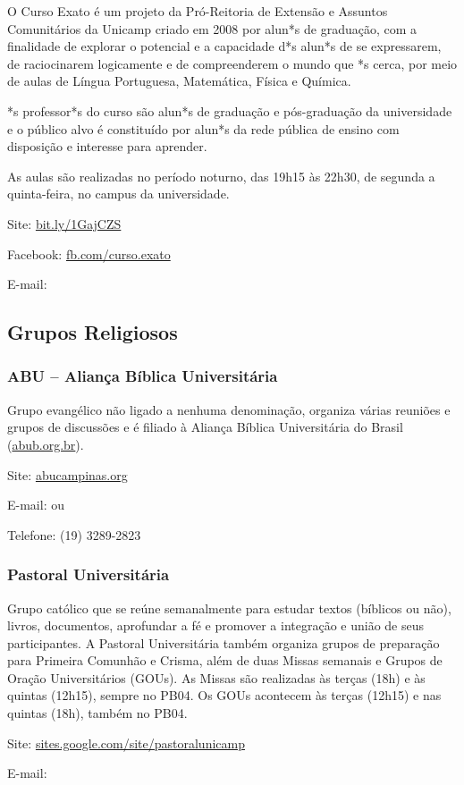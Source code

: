O Curso Exato é um projeto da Pró-Reitoria de Extensão e Assuntos Comunitários
da Unicamp criado em 2008 por alun*s de graduação, com a finalidade de explorar
o potencial e a capacidade d*s alun*s de se expressarem, de raciocinarem
logicamente e de compreenderem o mundo que *s cerca, por meio de aulas de Língua
Portuguesa, Matemática, Física e Química.

*s professor*s do curso são alun*s de graduação e pós-graduação da universidade
e o público alvo é constituído por alun*s da rede pública de ensino com
disposição e interesse para aprender.

As aulas são realizadas no período noturno, das 19h15 às 22h30, de segunda a
quinta-feira, no campus da universidade.

\begin{compactitemize}
    \item Site: \url{bit.ly/1GajCZS}
    \item Facebook: \url{fb.com/curso.exato}
    \item E-mail: 
\end{compactitemize}

\subsection{Grupos Religiosos}

\subsubsection{ABU -- Aliança Bíblica Universitária}

Grupo evangélico não ligado a nenhuma denominação, organiza várias reuniões e
grupos de discussões e é filiado à Aliança Bíblica Universitária do Brasil
(\url{abub.org.br}).

\begin{compactitemize}
    \item Site: \url{abucampinas.org}
    \item E-mail:  ou
    \item Telefone: (19) 3289-2823
\end{compactitemize}

\subsubsection{Pastoral Universitária}

Grupo católico que se reúne semanalmente para estudar textos (bíblicos ou não),
livros, documentos, aprofundar a fé e promover a integração e união de seus
participantes. A Pastoral Universitária também organiza grupos de preparação
para Primeira Comunhão e Crisma, além de duas Missas semanais e Grupos de Oração
Universitários (GOUs). As Missas são realizadas às terças (18h) e às quintas
(12h15), sempre no PB04. Os GOUs acontecem às terças (12h15) e nas quintas
(18h), também no PB04.

\begin{compactitemize}
    \item Site: \url{sites.google.com/site/pastoralunicamp}
    \item E-mail: 
\end{compactitemize}

